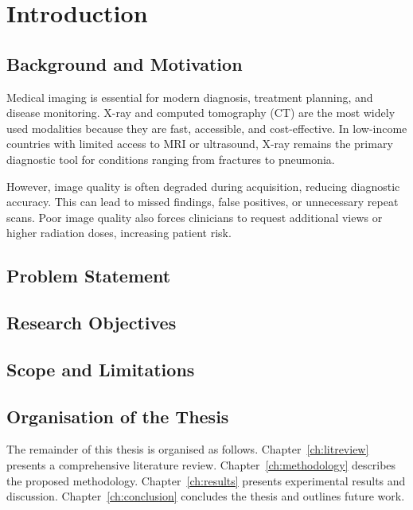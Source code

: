 
\chapter{Introduction}
\label{ch:intro}

\section{Background and Motivation}
\label{sec:bg}

Medical imaging is essential for modern diagnosis, treatment planning, and
disease monitoring.  X-ray and computed tomography (CT) are the most widely
used modalities because they are fast, accessible, and cost-effective.  In
low-income countries with limited access to MRI or ultrasound, X-ray remains
the primary diagnostic tool for conditions ranging from fractures to pneumonia.

However, image quality is often degraded during acquisition, reducing
diagnostic accuracy.  This can lead to missed findings, false positives, or
unnecessary repeat scans.  Poor image quality also forces clinicians to request
additional views or higher radiation doses, increasing patient risk.

\section{Problem Statement}
\label{sec:ps}


\section{Research Objectives}
\label{sec:obj}


\section{Scope and Limitations}
\label{sec:scope}


\section{Organisation of the Thesis}
\label{sec:org}

The remainder of this thesis is organised as follows.
Chapter~\ref{ch:litreview} presents a comprehensive literature review.
Chapter~\ref{ch:methodology} describes the proposed methodology.
Chapter~\ref{ch:results} presents experimental results and discussion.
Chapter~\ref{ch:conclusion} concludes the thesis and outlines future work.
